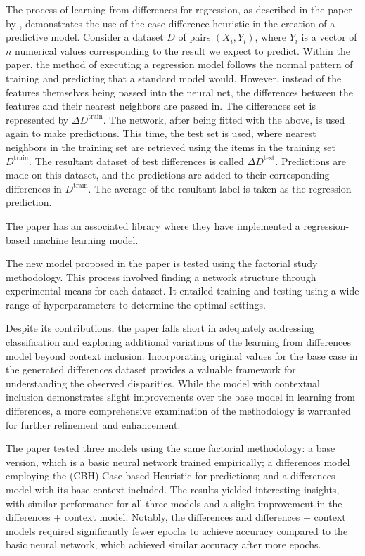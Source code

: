 \documentclass[a4paper, 12pt]{report}
\begin{document}
The process of learning from differences for regression, as described in the paper by \cite{learningFromDifferences2022},
demonstrates the use of the case difference heuristic in the creation of a predictive model.
Consider a dataset $D$ of pairs $(X_i, Y_i)$, where $Y_i$ is a vector of $n$ numerical values corresponding to the result we expect to predict. Within the paper,
the method of executing a regression model follows the normal pattern of training and predicting that a standard model would. However,
instead of the features themselves being passed into the neural net,
the differences between the features and their nearest neighbors are passed in. The differences set is represented by $\Delta D^{\text{train}}$.
The network, after being fitted with the above, is used again to make predictions. This time, the test set is used,
where nearest neighbors in the training set are retrieved using the items in the training set $D^{\text{train}}$.
The resultant dataset of test differences is called $\Delta D^{\text{test}}$. Predictions are made on this dataset,
and the predictions are added to their corresponding differences in $D^{\text{train}}$.
The average of the resultant label is taken as the regression prediction.

The paper \cite{learningFromDifferences2022} has an associated library where they have implemented a regression-based machine learning model.

The new model proposed in the paper is tested using the factorial study methodology.
This process involved finding a network structure through experimental means for each dataset.
It entailed training and testing using a wide range of hyperparameters to determine the optimal settings.

Despite its contributions, the paper falls short in adequately addressing classification and exploring additional variations of the learning from differences model beyond context inclusion.
Incorporating original values for the base case in the generated differences dataset provides a valuable framework for understanding the observed disparities.
While the model with contextual inclusion demonstrates slight improvements over the base model in learning from differences, a more comprehensive examination of the methodology
is warranted for further refinement and enhancement.

The paper tested three models using the same factorial methodology: a base version, which is a basic neural network trained empirically;
a differences model employing the (CBH) Case-based Heuristic for predictions; and a differences model with its base context included. The results yielded interesting insights,
with similar performance for all three models and a slight improvement in the differences $+$ context model.
Notably, the differences and differences $+$ context models required significantly fewer epochs to achieve accuracy compared to the basic neural network,
which achieved similar accuracy after more epochs.
\end{document}
